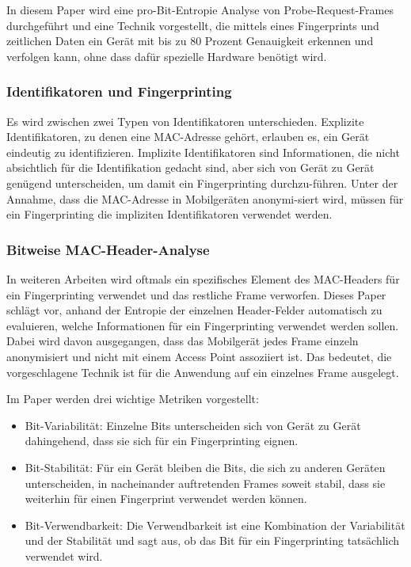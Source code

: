 In diesem Paper wird eine pro-Bit-Entropie Analyse von Probe-Request-Frames
durchgeführt und eine Technik vorgestellt, die mittels eines Fingerprints 
und zeitlichen Daten ein Gerät mit bis zu $80$ Prozent Genauigkeit erkennen und 
verfolgen kann, ohne dass dafür spezielle Hardware benötigt wird.

\subsubsection*{Identifikatoren und Fingerprinting}
Es wird zwischen zwei Typen von Identifikatoren unterschieden.
Explizite Identifikatoren, zu denen eine MAC-Adresse gehört, erlauben es,
ein Gerät eindeutig zu identifizieren.
Implizite Identifikatoren sind Informationen, die nicht absichtlich für 
die Identifikation gedacht sind, aber sich von Gerät zu Gerät genügend 
unterscheiden, um damit ein Fingerprinting durchzu-führen.
Unter der Annahme, dass die MAC-Adresse in Mobilgeräten anonymi-siert wird,
müssen für ein Fingerprinting die impliziten Identifikatoren verwendet werden.

\subsubsection*{Bitweise MAC-Header-Analyse}
In weiteren Arbeiten wird oftmals ein spezifisches Element des MAC-Headers
für ein Fingerprinting verwendet und das restliche Frame verworfen.
Dieses Paper schlägt vor, anhand der Entropie der einzelnen Header-Felder
automatisch zu evaluieren, welche Informationen für ein Fingerprinting 
verwendet werden sollen.
Dabei wird davon ausgegangen, dass das Mobilgerät jedes Frame einzeln
anonymisiert und nicht mit einem Access Point assoziiert ist. 
Das bedeutet, die vorgeschlagene Technik ist für die Anwendung auf 
ein einzelnes Frame ausgelegt.

Im Paper werden drei wichtige Metriken vorgestellt:
\begin{itemize}
    \item Bit-Variabilität: Einzelne Bits unterscheiden sich von Gerät zu
    Gerät dahingehend, dass sie sich für ein Fingerprinting eignen.
    \item Bit-Stabilität: Für ein Gerät bleiben die Bits, 
    die sich zu anderen Geräten unterscheiden, in nacheinander auftretenden
    Frames soweit stabil, dass sie weiterhin für einen Fingerprint 
    verwendet werden können.
    \item Bit-Verwendbarkeit: Die Verwendbarkeit ist eine Kombination der
    Variabilität und der Stabilität und sagt aus, ob das Bit für ein 
    Fingerprinting tatsächlich verwendet wird.
\end{itemize}

